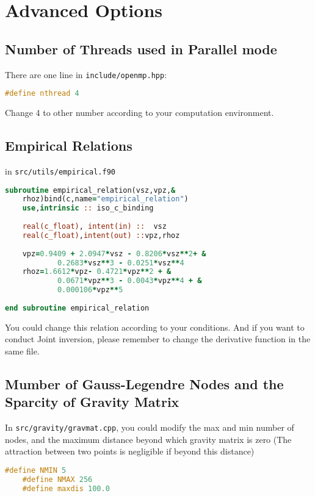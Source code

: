 \documentclass[UTF8]{article}
\begin{document}
    \section{Advanced Options}
    \subsection{Number of Threads used in Parallel mode}\label{number of threads}
    There are one line in \verb!include/openmp.hpp!:
    \begin{lstlisting}[language=c++]
    #define nthread 4
    \end{lstlisting}
    Change 4 to other number according to your computation environment.

    \subsection{Empirical Relations}
    in \verb!src/utils/empirical.f90! 
\begin{lstlisting}[language=fortran]
subroutine empirical_relation(vsz,vpz,&
    rhoz)bind(c,name="empirical_relation")
    use,intrinsic :: iso_c_binding
    
    real(c_float), intent(in) ::  vsz
    real(c_float),intent(out) ::vpz,rhoz
    
    vpz=0.9409 + 2.0947*vsz - 0.8206*vsz**2+ &
            0.2683*vsz**3 - 0.0251*vsz**4
    rhoz=1.6612*vpz- 0.4721*vpz**2 + &
            0.0671*vpz**3 - 0.0043*vpz**4 + & 
            0.000106*vpz**5
    
end subroutine empirical_relation
\end{lstlisting}
    You could change this relation according to your conditions. And if you want to conduct
    Joint inversion, please remember to change the derivative function in the same file.

    \subsection{Mumber of Gauss-Legendre Nodes and the Sparcity of Gravity Matrix}
    In \verb!src/gravity/gravmat.cpp!, you could modify the max and min number of nodes,
    and the maximum distance beyond which gravity matrix is zero (The attraction between two 
    points is negligible if beyond this distance)
    \begin{lstlisting}[language=c++]
    #define NMIN 5
    #define NMAX 256
    #define maxdis 100.0 
    \end{lstlisting}
\end{document}
